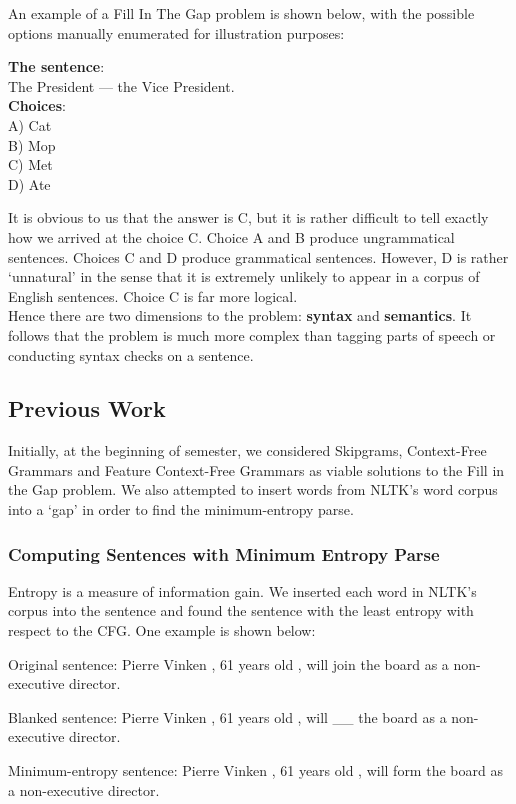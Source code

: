 \documentclass{article}[12pt]
\theoremstyle{definition}
\begin{document}
An example of a Fill In The Gap problem is shown below, with the possible options manually enumerated for illustration purposes: 
\begin{flushleft}
\flushleft\textbf{The sentence}: \\
\hspace*{10mm} The President --- the Vice President.\\
\textbf{Choices}:\\
\hspace*{10mm} A) Cat\\
\hspace*{10mm} B) Mop\\
\hspace*{10mm} C) Met\\
\hspace*{10mm} D) Ate\\
\vspace{5mm}

\end{flushleft}

It is obvious to us that the answer is C, but it is rather difficult to tell exactly how we arrived at the choice C. Choice A and B produce ungrammatical sentences. Choices C and D produce grammatical sentences. However, D is rather `unnatural' in the sense that it is extremely unlikely to appear in a corpus of English sentences. Choice C is far more logical. \\ 

Hence there are two dimensions to the problem: \textbf{syntax} and \textbf{semantics}. It follows that the problem is much more complex than tagging parts of speech or conducting syntax checks on a sentence. 

\subsection{Previous Work}

Initially, at the beginning of semester, we considered Skipgrams, Context-Free Grammars and Feature Context-Free Grammars as viable solutions to the Fill in the Gap problem. We also attempted to insert words from NLTK's word corpus into a `gap' in order to find the minimum-entropy parse.

\subsubsection{Computing Sentences with Minimum Entropy Parse}

Entropy is a measure of information gain. We inserted each word in NLTK's corpus into the sentence and found the sentence with the least entropy with respect to the CFG. One example is shown below: 
\begin{spverbatim}
Original sentence: Pierre Vinken , 61 years old , will join the board as a non-executive director.

Blanked sentence: Pierre Vinken , 61 years old , will __ the board as a non-executive director.

Minimum-entropy sentence: Pierre Vinken , 61 years old , will form the board as a non-executive director. 

\end{spverbatim}
\end{document}
